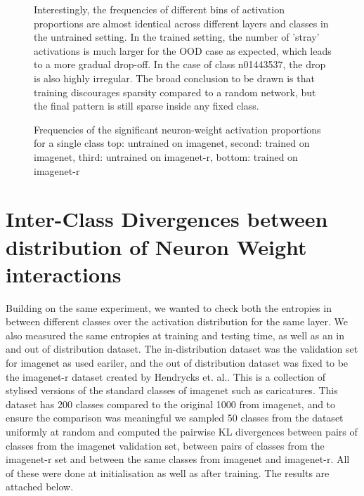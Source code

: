 \documentclass{article}
\begin{document}
\begin{figure}[H]
        \caption{Frequencies of the significant neuron-weight activation proportions for a single class top: untrained on imagenet, second: trained on imagenet, third: untrained on imagenet-r, bottom: trained on imagenet-r}
        \label{fig:frequency_neuron_weight2}

        Interestingly, the frequencies of different bins of activation proportions are almost identical across different layers and classes in the untrained setting. In the trained setting, the number of 'stray' activations is much larger for the OOD case as expected, which leads to a more gradual drop-off. In the case of class n01443537, the drop is also highly irregular. The broad conclusion to be drawn is that training discourages sparsity compared to a random network, but the final pattern is still sparse inside any fixed class. 
    \end{figure}
    
    

    \section{Inter-Class Divergences between distribution of Neuron Weight interactions}
        Building on the same experiment, we wanted to check both the entropies in between different classes over the activation distribution for the same layer. We also measured the same entropies at training and testing time, as well as an in and out of distribution dataset. The in-distribution dataset was the validation set for imagenet as used eariler, and the out of distribution dataset was fixed to be the imagenet-r dataset created by Hendrycks et. al.. This is a collection of stylised versions of the standard classes of imagenet such as caricatures. This dataset has 200 classes compared to the original 1000 from imagenet, and to ensure the comparison was meaningful we sampled 50 classes from the dataset uniformly at random and computed the pairwise KL divergences between pairs of classes from the imagenet validation set, between pairs of classes from the imagenet-r set and between the same classes from imagenet and imagenet-r. All of these were done at initialisation as well as after training. The results are attached below. 
\end{document}
